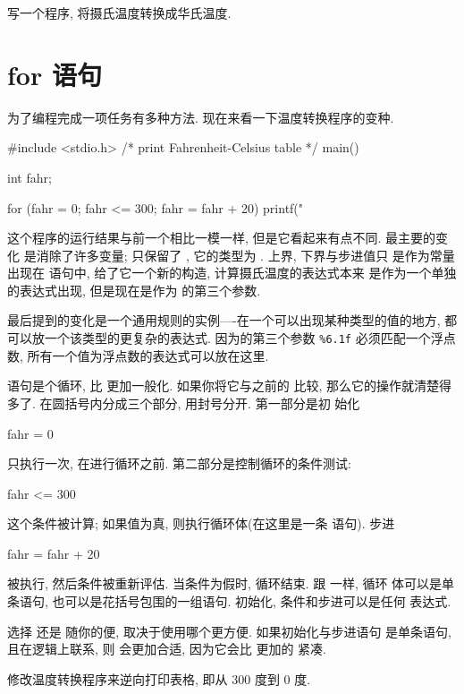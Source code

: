 \exercise 写一个程序, 将摄氏温度转换成华氏温度.

\section{for 语句}
为了编程完成一项任务有多种方法. 现在来看一下温度转换程序的变种.
\begin{myverbatim}
    #include <stdio.h>
    /* print Fahrenheit-Celsius table */
    main()
    {
        int fahr;
        
        for (fahr = 0; fahr <= 300; fahr = fahr + 20)
            printf("%
    }
\end{myverbatim}
这个程序的运行结果与前一个相比一模一样, 但是它看起来有点不同. 最主要的变化
是消除了许多变量; 只保留了 \fahr, 它的类型为 \cint. 上界, 下界与步进值只
是作为常量出现在 \cfor 语句中, 给了它一个新的构造, 计算摄氏温度的表达式本来
是作为一个单独的表达式出现, 但是现在是作为 \printf 的第三个参数.

最后提到的变化是一个通用规则的实例----在一个可以出现某种类型的值的地方, 
都可以放一个该类型的更复杂的表达式. 因为\printf 的第三个参数 \verb"%6.1f"
必须匹配一个浮点数, 所有一个值为浮点数的表达式可以放在这里.

\cfor 语句是个循环, 比 \cwhile 更加一般化. 如果你将它与之前的 \cwhile 比较, 
那么它的操作就清楚得多了. 在圆括号内分成三个部分, 用封号分开. 第一部分是初
始化
\begin{myverbatim}
    fahr = 0
\end{myverbatim}
只执行一次, 在进行循环之前. 第二部分是控制循环的条件测试:
\begin{myverbatim}
    fahr <= 300 
\end{myverbatim}
这个条件被计算; 如果值为真, 则执行循环体(在这里是一条 \printf 语句). 步进
\begin{myverbatim}
    fahr = fahr + 20 
\end{myverbatim}
被执行, 然后条件被重新评估. 当条件为假时, 循环结束. 跟 \cwhile 一样, 循环 
体可以是单条语句, 也可以是花括号包围的一组语句. 初始化, 条件和步进可以是任何
表达式.

选择 \cwhile 还是 \cfor 随你的便, 取决于使用哪个更方便. 如果初始化与步进语句
是单条语句, 且在逻辑上联系, 则 \cfor 会更加合适, 因为它会比 \cwhile 更加的
紧凑.

\exercise 修改温度转换程序来逆向打印表格, 即从 300 度到 0 度.

